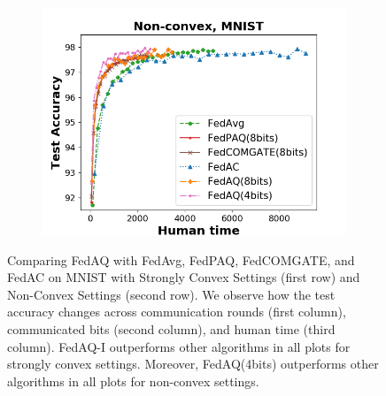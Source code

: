 \begin{figure}[hbt!]
\begin{subfigure}[b]{0.31\textwidth}
    \includegraphics[width=\textwidth]{figure/accuracy_iid_time_localstep_100_2.png}
    \end{subfigure}
    \caption{Comparing FedAQ with FedAvg, FedPAQ, FedCOMGATE, and FedAC on MNIST with Strongly Convex Settings (first row) and Non-Convex Settings (second row). We observe how the test accuracy changes across communication rounds (first column), communicated bits (second column), and human time (third column). FedAQ-I outperforms other algorithms in all plots for strongly convex settings. Moreover, FedAQ(4bits) outperforms other algorithms in all plots for non-convex settings.}
    \label{mnist_graph}
\end{figure}

